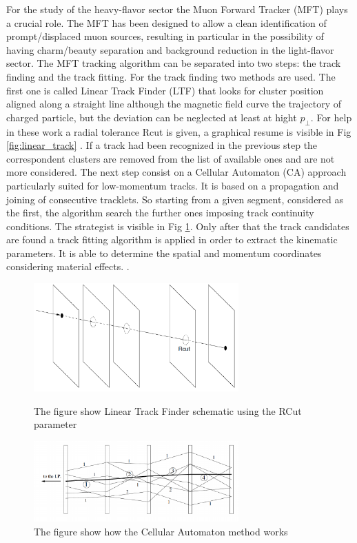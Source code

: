 \documentclass[12pt,a4paper]{book}
\begin{document}
For the study of the heavy-flavor sector the Muon Forward Tracker (MFT) plays a crucial role. The MFT has been designed to allow a clean identification of prompt/displaced muon sources, resulting in particular in the possibility of having charm/beauty separation and background reduction in the light-flavor sector. The MFT tracking algorithm can be separated into two steps: the track finding and the track fitting. For the track finding two methods are used. The first one is called Linear Track Finder (LTF) that looks for cluster position aligned along a straight line although the magnetic field curve the trajectory of charged particle, but the deviation can be neglected at least at hight $p_\perp$. For help in these work a radial tolerance Rcut is given, a graphical resume is visible in Fig \ref{fig:linear_track} . If a track had been recognized in the previous step the correspondent clusters are removed from the list of available ones and are not more considered. The next step consist on a Cellular Automaton (CA) approach particularly suited for low-momentum tracks. It is based on a propagation and joining of consecutive tracklets. So starting from a given segment, considered as the first, the algorithm search the further ones imposing track continuity conditions. The strategist is visible in Fig \ref{fig:CA_track}. Only after that the track candidates are found a track fitting algorithm is applied in order to extract the kinematic parameters. It is able to determine the spatial and momentum coordinates considering material effects. \cite{Herrmann:2920632}.
\begin{figure}
	\centering
	\begin{minipage}{0.45\textwidth}
		\includegraphics[width=0.7\textwidth]{pictures/linear_track.png}
		\caption{The figure show Linear Track Finder schematic using the RCut parameter \cite{CERN-LHCC-2015-001}}
		\label{fig:linear_track}
		
	\end{minipage}
	\begin{minipage}{0.5\textwidth}
		\includegraphics[width=0.7\textwidth]{pictures/CA_track.png}
		\caption{The figure show how the Cellular Automaton method works \cite{CERN-LHCC-2015-001}}
		\label{fig:CA_track}
	\end{minipage}%
\end{figure}
\end{document}

